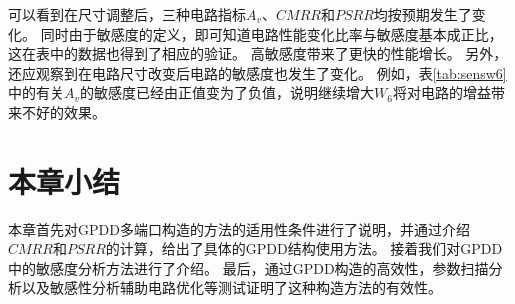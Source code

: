 可以看到在尺寸调整后，三种电路指标$A_v$、$CMRR$和$PSRR$均按预期发生了变化。
同时由于敏感度的定义，即可知道电路性能变化比率与敏感度基本成正比，这在表中的数据也得到了相应的验证。
高敏感度带来了更快的性能增长。
另外，还应观察到在电路尺寸改变后电路的敏感度也发生了变化。
例如，表\ref{tab:sensw6}中的有关$A_v$的敏感度已经由正值变为了负值，说明继续增大$W_6$将对电路的增益带来不好的效果。

\section{本章小结}
\label{sec:cmps:con}

本章首先对GPDD多端口构造的方法的适用性条件进行了说明，并通过介绍$CMRR$和$PSRR$的计算，给出了具体的GPDD结构使用方法。
接着我们对GPDD中的敏感度分析方法进行了介绍。
最后，通过GPDD构造的高效性，参数扫描分析以及敏感性分析辅助电路优化等测试证明了这种构造方法的有效性。